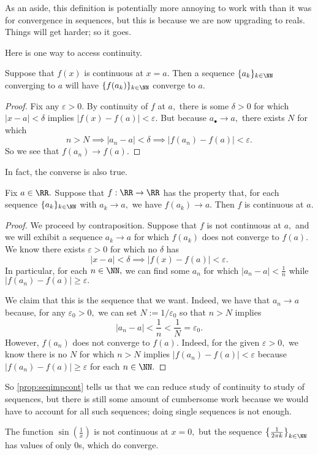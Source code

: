 As an aside, this definition is potentially more annoying to work with than it was for convergence in sequences, but this is because we are now upgrading to reals. Things will get harder; so it goes.

Here is one way to access continuity.
\begin{proposition}
	Suppose that $f(x)$ is continuous at $x=a.$ Then a sequence $\{a_k\}_{k\in\NN}$ converging to $a$ will have $\{f(a_k)\}_{k\in\NN}$ converge to $a.$
\end{proposition}
\begin{proof}
	Fix any $\varepsilon>0.$ By continuity of $f$ at $a,$ there is some $\delta>0$ for which $|x-a|<\delta$ implies $|f(x)-f(a)|<\varepsilon.$ But because $a_\bullet\to a,$ there exists $N$ for which
	\[n>N\implies|a_n-a|<\delta\implies|f(a_n)-f(a)|<\varepsilon.\]
	So we see that $f(a_n)\to f(a).$
\end{proof}
In fact, the converse is also true.
\begin{proposition} \label{prop:seqimpcont}
	Fix $a\in\RR.$ Suppose that $f:\RR\to\RR$ has the property that, for each sequence $\{a_k\}_{k\in\NN}$ with $a_k\to a,$ we have $f(a_k)\to a.$ Then $f$ is continuous at $a.$
\end{proposition}
\begin{proof}
	We proceed by contraposition. Suppose that $f$ is not continuous at $a,$ and we will exhibit a sequence $a_k\to a$ for which $f(a_k)$ does not converge to $f(a).$ We know there exists $\varepsilon>0$ for which no $\delta$ has
	\[|x-a|<\delta\implies|f(x)-f(a)|<\varepsilon.\]
	In particular, for each $n\in\NN,$ we can find some $a_n$ for which $|a_n-a|<\frac1n$ while $|f(a_n)-f(a)|\ge\varepsilon.$

	We claim that this is the sequence that we want. Indeed, we have that $a_n\to a$ because, for any $\varepsilon_0>0,$ we can set $N:=1/\varepsilon_0$ so that $n>N$ implies
	\[|a_n-a|<\frac1n<\frac1N=\varepsilon_0.\]
	However, $f(a_n)$ does not converge to $f(a).$ Indeed, for the given $\varepsilon>0,$ we know there is no $N$ for which $n>N$ implies $|f(a_n)-f(a)|<\varepsilon$ because $|f(a_n)-f(a)|\ge\varepsilon$ for each $n\in\NN.$
\end{proof}
So \autoref{prop:seqimpcont} tells us that we can reduce study of continuity to study of sequences, but there is still some amount of cumbersome work because we would have to account for all such sequences; doing single sequences is not enough.
\begin{example}
	The function $\sin\left(\frac1x\right)$ is not continuous at $x=0,$ but the sequence $\left\{\frac1{2\pi k}\right\}_{k\in\NN}$ has values of only $0$s, which do converge.
\end{example}
